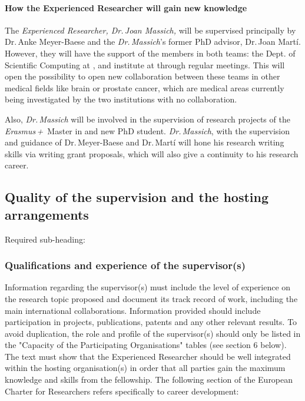 \paragraph{How the Experienced Researcher will gain new knowledge}

The \emph{Experienced Researcher, Dr.\,Joan Massich,} will be supervised principally by Dr.\,Anke Meyer-Baese and the \emph{Dr.\,Massich}'s former PhD advisor, Dr.\,Joan Mart\'i.
However, they will have the support of the members in both teams: the Dept. of Scientific Computing at \florida, and \vicorob institute at \udg through regular meetings. This will open the possibility to open new collaboration between these teams in other medical fields like brain \mri or prostate cancer, which are medical areas currently being investigated by the two institutions with no collaboration.

Also, \emph{Dr.\,Massich} will be involved in the supervision of research projects of the \emph{Erasmus\,+\,} Master in \maia {} and new PhD student. \emph{Dr.\,Massich}, with the supervision and guidance of Dr.\,Meyer-Baese and Dr.\,Mart\'i will hone his research writing skills via writing grant proposals, which will also give a continuity to his research career.



\subsection{Quality of the supervision and the hosting arrangements}
\label{sec:supervision}

Required sub-heading:
\subsubsection*{Qualifications and experience of the supervisor(s)}

Information regarding the supervisor(s) must include the level of experience on the research topic proposed and document its track record of work, including the main international collaborations. Information provided should include participation in projects, publications, patents and any other relevant results.
To avoid duplication, the role and profile of the supervisor(s) should only be listed in the "Capacity of the Participating Organisations" tables (see section 6 below).
The text must show that the Experienced Researcher should be well integrated within the hosting organisation(s) in order that all parties gain the maximum knowledge and skills from the fellowship.
The following section of the European Charter for Researchers refers specifically to career development:

